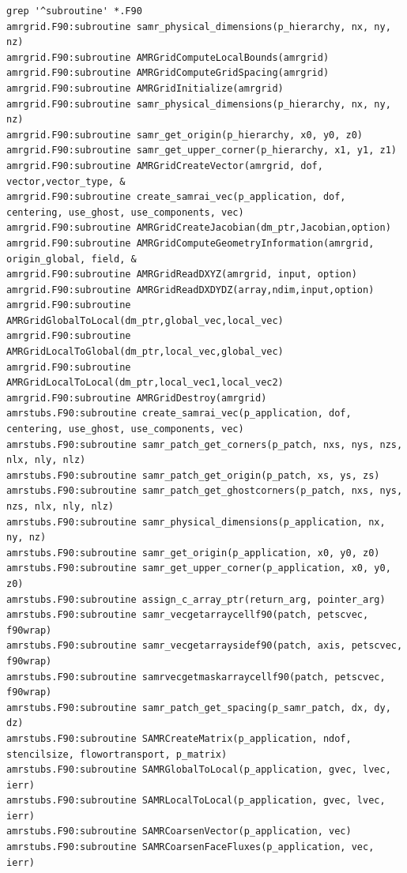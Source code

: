 \documentclass[12pt]{article}
\begin{document}
\footnotesize
\begin{verbatim} 
grep '^subroutine' *.F90
amrgrid.F90:subroutine samr_physical_dimensions(p_hierarchy, nx, ny, nz)
amrgrid.F90:subroutine AMRGridComputeLocalBounds(amrgrid)
amrgrid.F90:subroutine AMRGridComputeGridSpacing(amrgrid)
amrgrid.F90:subroutine AMRGridInitialize(amrgrid)
amrgrid.F90:subroutine samr_physical_dimensions(p_hierarchy, nx, ny, nz)
amrgrid.F90:subroutine samr_get_origin(p_hierarchy, x0, y0, z0)
amrgrid.F90:subroutine samr_get_upper_corner(p_hierarchy, x1, y1, z1)
amrgrid.F90:subroutine AMRGridCreateVector(amrgrid, dof, vector,vector_type, &
amrgrid.F90:subroutine create_samrai_vec(p_application, dof, centering, use_ghost, use_components, vec)
amrgrid.F90:subroutine AMRGridCreateJacobian(dm_ptr,Jacobian,option)
amrgrid.F90:subroutine AMRGridComputeGeometryInformation(amrgrid, origin_global, field, &
amrgrid.F90:subroutine AMRGridReadDXYZ(amrgrid, input, option)
amrgrid.F90:subroutine AMRGridReadDXDYDZ(array,ndim,input,option)
amrgrid.F90:subroutine AMRGridGlobalToLocal(dm_ptr,global_vec,local_vec)
amrgrid.F90:subroutine AMRGridLocalToGlobal(dm_ptr,local_vec,global_vec)
amrgrid.F90:subroutine AMRGridLocalToLocal(dm_ptr,local_vec1,local_vec2)
amrgrid.F90:subroutine AMRGridDestroy(amrgrid)
amrstubs.F90:subroutine create_samrai_vec(p_application, dof, centering, use_ghost, use_components, vec)
amrstubs.F90:subroutine samr_patch_get_corners(p_patch, nxs, nys, nzs, nlx, nly, nlz)
amrstubs.F90:subroutine samr_patch_get_origin(p_patch, xs, ys, zs)
amrstubs.F90:subroutine samr_patch_get_ghostcorners(p_patch, nxs, nys, nzs, nlx, nly, nlz)
amrstubs.F90:subroutine samr_physical_dimensions(p_application, nx, ny, nz)
amrstubs.F90:subroutine samr_get_origin(p_application, x0, y0, z0)
amrstubs.F90:subroutine samr_get_upper_corner(p_application, x0, y0, z0)
amrstubs.F90:subroutine assign_c_array_ptr(return_arg, pointer_arg)
amrstubs.F90:subroutine samr_vecgetarraycellf90(patch, petscvec, f90wrap)
amrstubs.F90:subroutine samr_vecgetarraysidef90(patch, axis, petscvec, f90wrap)
amrstubs.F90:subroutine samrvecgetmaskarraycellf90(patch, petscvec, f90wrap)
amrstubs.F90:subroutine samr_patch_get_spacing(p_samr_patch, dx, dy, dz)
amrstubs.F90:subroutine SAMRCreateMatrix(p_application, ndof, stencilsize, flowortransport, p_matrix)
amrstubs.F90:subroutine SAMRGlobalToLocal(p_application, gvec, lvec, ierr)
amrstubs.F90:subroutine SAMRLocalToLocal(p_application, gvec, lvec, ierr)
amrstubs.F90:subroutine SAMRCoarsenVector(p_application, vec)
amrstubs.F90:subroutine SAMRCoarsenFaceFluxes(p_application, vec, ierr)

\end{verbatim}
\end{document}
